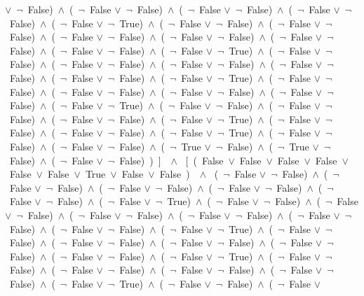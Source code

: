 ﻿\documentclass[a4paper,10pt]{article}
\begin{document}
$\vee$\  $\neg$\ False)\ $\wedge$\ (\  $\neg$\ False $\vee$\  $\neg$\ False)\ $\wedge$\ (\  $\neg$\ False $\vee$\  $\neg$\ False)\ $\wedge$\ (\  $\neg$\ False $\vee$\  $\neg$\ False)\ $\wedge$\ (\  $\neg$\ False $\vee$\  $\neg$\ True)\ $\wedge$\ (\  $\neg$\ False $\vee$\  $\neg$\ False)\ $\wedge$\ (\  $\neg$\ False $\vee$\  $\neg$\ False)\ $\wedge$\ (\  $\neg$\ False $\vee$\  $\neg$\ False)\ $\wedge$\ (\  $\neg$\ False $\vee$\  $\neg$\ False)\ $\wedge$\ (\  $\neg$\ False $\vee$\  $\neg$\ False)\ $\wedge$\ (\  $\neg$\ False $\vee$\  $\neg$\ False)\ $\wedge$\ (\  $\neg$\ False $\vee$\  $\neg$\ True)\ $\wedge$\ (\  $\neg$\ False $\vee$\  $\neg$\ False)\ $\wedge$\ (\  $\neg$\ False $\vee$\  $\neg$\ False)\ $\wedge$\ (\  $\neg$\ False $\vee$\  $\neg$\ False)\ $\wedge$\ (\  $\neg$\ False $\vee$\  $\neg$\ False)\ $\wedge$\ (\  $\neg$\ False $\vee$\  $\neg$\ False)\ $\wedge$\ (\  $\neg$\ False $\vee$\  $\neg$\ True)\ $\wedge$\ (\  $\neg$\ False $\vee$\  $\neg$\ False)\ $\wedge$\ (\  $\neg$\ False $\vee$\  $\neg$\ False)\ $\wedge$\ (\  $\neg$\ False $\vee$\  $\neg$\ False)\ $\wedge$\ (\  $\neg$\ False $\vee$\  $\neg$\ False)\ $\wedge$\ (\  $\neg$\ False $\vee$\  $\neg$\ True)\ $\wedge$\ (\  $\neg$\ False $\vee$\  $\neg$\ False)\ $\wedge$\ (\  $\neg$\ False $\vee$\  $\neg$\ False)\ $\wedge$\ (\  $\neg$\ False $\vee$\  $\neg$\ False)\ $\wedge$\ (\  $\neg$\ False $\vee$\  $\neg$\ True)\ $\wedge$\ (\  $\neg$\ False $\vee$\  $\neg$\ False)\ $\wedge$\ (\  $\neg$\ False $\vee$\  $\neg$\ False)\ $\wedge$\ (\  $\neg$\ False $\vee$\  $\neg$\ True)\ $\wedge$\ (\  $\neg$\ False $\vee$\  $\neg$\ False)\ $\wedge$\ (\  $\neg$\ False $\vee$\  $\neg$\ False)\ $\wedge$\ (\  $\neg$\ True $\vee$\  $\neg$\ False)\ $\wedge$\ (\  $\neg$\ True $\vee$\  $\neg$\ False)\ $\wedge$\ (\  $\neg$\ False $\vee$\  $\neg$\ False)\ )\ ]\ \ $\wedge$ \ [\ (\ False\ $\vee$\ False\ $\vee$\ False\ $\vee$\ False\ $\vee$\ False\ $\vee$\ False\ $\vee$\ True\ $\vee$\ False\ $\vee$\ False\ )\ \ $\wedge$ \ (\  $\neg$\ False $\vee$\  $\neg$\ False)\ $\wedge$\ (\  $\neg$\ False $\vee$\  $\neg$\ False)\ $\wedge$\ (\  $\neg$\ False $\vee$\  $\neg$\ False)\ $\wedge$\ (\  $\neg$\ False $\vee$\  $\neg$\ False)\ $\wedge$\ (\  $\neg$\ False $\vee$\  $\neg$\ False)\ $\wedge$\ (\  $\neg$\ False $\vee$\  $\neg$\ True)\ $\wedge$\ (\  $\neg$\ False $\vee$\  $\neg$\ False)\ $\wedge$\ (\  $\neg$\ False $\vee$\  $\neg$\ False)\ $\wedge$\ (\  $\neg$\ False $\vee$\  $\neg$\ False)\ $\wedge$\ (\  $\neg$\ False $\vee$\  $\neg$\ False)\ $\wedge$\ (\  $\neg$\ False $\vee$\  $\neg$\ False)\ $\wedge$\ (\  $\neg$\ False $\vee$\  $\neg$\ False)\ $\wedge$\ (\  $\neg$\ False $\vee$\  $\neg$\ True)\ $\wedge$\ (\  $\neg$\ False $\vee$\  $\neg$\ False)\ $\wedge$\ (\  $\neg$\ False $\vee$\  $\neg$\ False)\ $\wedge$\ (\  $\neg$\ False $\vee$\  $\neg$\ False)\ $\wedge$\ (\  $\neg$\ False $\vee$\  $\neg$\ False)\ $\wedge$\ (\  $\neg$\ False $\vee$\  $\neg$\ False)\ $\wedge$\ (\  $\neg$\ False $\vee$\  $\neg$\ True)\ $\wedge$\ (\  $\neg$\ False $\vee$\  $\neg$\ False)\ $\wedge$\ (\  $\neg$\ False $\vee$\  $\neg$\ False)\ $\wedge$\ (\  $\neg$\ False $\vee$\  $\neg$\ False)\ $\wedge$\ (\  $\neg$\ False $\vee$\  $\neg$\ False)\ $\wedge$\ (\  $\neg$\ False $\vee$\  $\neg$\ True)\ $\wedge$\ (\  $\neg$\ False $\vee$\  $\neg$\ False)\ $\wedge$\ (\  $\neg$\ False $\vee$\  
\end{document}
